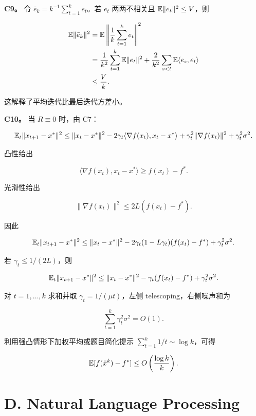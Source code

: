 \textbf{C9。} 令 \(\bar e_k=k^{-1}\sum_{t=1}^{k}e_t\)。若 \(e_t\) 两两不相关且 \(\mathbb{E}\|e_t\|^2\le V\)，则

\[
\begin{aligned}
  \mathbb{E}\|\bar e_k\|^2
  &=
  \mathbb{E}\left\|
    \frac1k\sum_{t=1}^{k}e_t
  \right\|^2\\
  &=
  \frac1{k^2}\sum_{t=1}^{k}\mathbb{E}\|e_t\|^2
  +
  \frac{2}{k^2}\sum_{s<t}\mathbb{E}\langle e_s,e_t\rangle\\
  &\le \frac{V}{k}.
\end{aligned}
\]

这解释了平均迭代比最后迭代方差小。

\textbf{C10。} 当 \(R\equiv0\) 时，由 C7：

\[
  \mathbb{E}_t\|x_{t+1}-x^*\|^2
  \le
  \|x_t-x^*\|^2
  -2\gamma_t\langle\nabla f(x_t),x_t-x^*\rangle
  +\gamma_t^2\|\nabla f(x_t)\|^2
  +\gamma_t^2\sigma^2.
\]

凸性给出

\[
  \langle\nabla f(x_t),x_t-x^*\rangle\ge f(x_t)-f^*.
\]

光滑性给出

\[
  \|\nabla f(x_t)\|^2\le 2L(f(x_t)-f^*).
\]

因此

\[
  \mathbb{E}_t\|x_{t+1}-x^*\|^2
  \le
  \|x_t-x^*\|^2
  -
  2\gamma_t(1-L\gamma_t)(f(x_t)-f^*)
  +
  \gamma_t^2\sigma^2.
\]

若 \(\gamma_t\le 1/(2L)\)，则

\[
  \mathbb{E}_t\|x_{t+1}-x^*\|^2
  \le
  \|x_t-x^*\|^2
  -
  \gamma_t(f(x_t)-f^*)
  +
  \gamma_t^2\sigma^2.
\]

对 \(t=1,\ldots,k\) 求和并取 \(\gamma_t=1/(\mu t)\)，左侧 telescoping，右侧噪声和为

\[
  \sum_{t=1}^{k}\gamma_t^2\sigma^2=O(1).
\]

利用强凸情形下加权平均或题目简化提示 \(\sum_{t=1}^{k}1/t\sim\log k\)，可得

\[
  \mathbb{E}[f(\bar x^k)-f^*]
  \le
  O\left(\frac{\log k}{k}\right).
\]

\section{D. Natural Language Processing}

